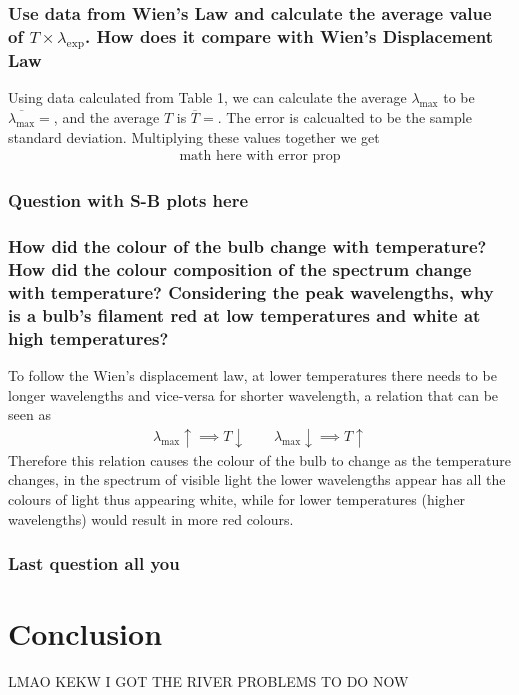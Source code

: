 \documentclass{article}
\begin{document}
\newpage

\subsubsection*{Use data from Wien's Law and calculate the average value of $T\times \lambda_{\exp}$.
How does it compare with Wien's Displacement Law}
Using data calculated from Table 1, we can calculate the average $\lambda_{\max}$
to be $\overline{\lambda_{\max}} = $, and the average $T$ is $\overline{T} = $.
The error is calcualted to be the sample standard deviation. Multiplying these
values together we get
\begin{align*}
    \text{math here with error prop}
\end{align*}

\subsubsection*{Question with S-B plots here}

\newpage
\subsubsection*{How did the colour of the bulb change with temperature? How did
the colour composition of the spectrum change with temperature? Considering the
peak wavelengths, why is a bulb's filament red at low temperatures and white at
high temperatures?}
To follow the Wien's displacement law, at lower temperatures there needs to be
longer wavelengths and vice-versa for shorter wavelength, a relation that can be
seen as 
\begin{align*}
    \lambda_{\max}\uparrow \implies T\downarrow \ \ \ \ \ \ \ \ \ 
    \lambda_{\max}\downarrow \implies T\uparrow
\end{align*}
Therefore this relation causes the colour of the bulb to change as the temperature
changes, in the spectrum of visible light the lower wavelengths appear has
all the colours of light thus appearing white, while for lower temperatures 
(higher wavelengths) would result in more red colours.

\subsubsection*{Last question all you}


\section{Conclusion}
LMAO KEKW I GOT THE RIVER PROBLEMS TO DO NOW
\end{document}
